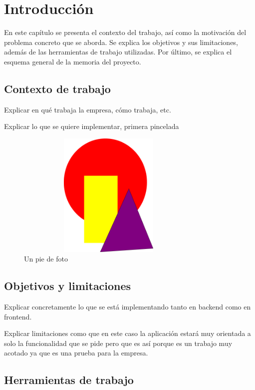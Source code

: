\chapter{Introducción}
\label{ch:no_lineal}

En este capítulo se presenta el contexto del trabajo, así como la motivación del problema concreto que se aborda. Se explica los objetivos y sus limitaciones, además de las herramientas de trabajo utilizadas. Por último, se explica el esquema general de la memoria del proyecto.

\section{Contexto de trabajo}

Explicar en qué trabaja la empresa, cómo trabaja, etc.

Explicar lo que se quiere implementar, primera pincelada

\begin{figure}[!h]
    \centering
    \includegraphics[width=0.8\textwidth,height=6cm]{Imagenes/Arte_abstracto}
    \caption{Un pie de foto}
    \label{fig:una_etiqueta}
\end{figure}


\section{Objetivos y limitaciones}

Explicar concretamente lo que se está implementando tanto en backend como en frontend. 

Explicar limitaciones como que en este caso la aplicación estará muy orientada a solo la funcionalidad que se pide pero que es así porque es un trabajo muy acotado ya que es una prueba para la empresa.

\section{Herramientas de trabajo}

